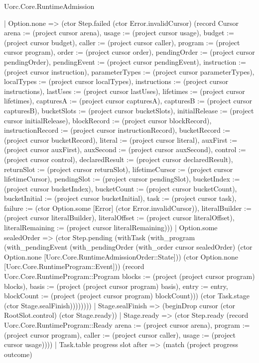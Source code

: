 \begin{lexlean}{Uorc.Core.RuntimeAdmission}
\begin{semanticmodule}
{              | Option.none => (ctor Step.failed (ctor Error.invalidCursor) (record Cursor {arena := (project cursor arena), usage := (project cursor usage), budget := (project cursor budget), caller := (project cursor caller), program := (project cursor program), order := (project cursor order), pendingOrder := (project cursor pendingOrder), pendingEvent := (project cursor pendingEvent), instruction := (project cursor instruction), parameterTypes := (project cursor parameterTypes), localTypes := (project cursor localTypes), instructions := (project cursor instructions), lastUses := (project cursor lastUses), lifetimes := (project cursor lifetimes), capturesA := (project cursor capturesA), capturesB := (project cursor capturesB), bucketSlots := (project cursor bucketSlots), initialRelease := (project cursor initialRelease), blockRecord := (project cursor blockRecord), instructionRecord := (project cursor instructionRecord), bucketRecord := (project cursor bucketRecord), literal := (project cursor literal), auxFirst := (project cursor auxFirst), auxSecond := (project cursor auxSecond), control := (project cursor control), declaredResult := (project cursor declaredResult), returnSlot := (project cursor returnSlot), lifetimeCursor := (project cursor lifetimeCursor), pendingSlot := (project cursor pendingSlot), bucketIndex := (project cursor bucketIndex), bucketCount := (project cursor bucketCount), bucketInitial := (project cursor bucketInitial), task := (project cursor task), failure := (ctor Option.some [Error] (ctor Error.invalidCursor)), literalBuilder := (project cursor literalBuilder), literalOffset := (project cursor literalOffset), literalRemaining := (project cursor literalRemaining)}))
              | Option.some sealedOrder => (ctor Step.pending (withTask (with_program (with_pendingEvent (with_pendingOrder (with_order cursor sealedOrder) (ctor Option.none [Uorc.Core.RuntimeAdmissionOrder::State])) (ctor Option.none [Uorc.Core.RuntimeProgram::Event])) (record Uorc.Core.RuntimeProgram::Program {blocks := (project (project cursor program) blocks), basis := (project (project cursor program) basis), entry := entry, blockCount := (project (project cursor program) blockCount)})) (ctor Task.stage (ctor Stage.sealFinish))))))))
      | Stage.sealFinish => (beginDrop cursor (ctor RootSlot.control) (ctor Stage.ready))
      | Stage.ready => (ctor Step.ready (record Uorc.Core.RuntimeProgram::Ready {arena := (project cursor arena), program := (project cursor program), caller := (project cursor caller), usage := (project cursor usage)})))
    | Task.table progress slot after => (match (project progress outcome)
}
\end{semanticmodule}
\end{lexlean}
